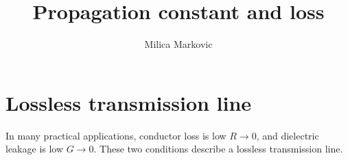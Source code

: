 \documentclass{ximera}
\title{Propagation constant and loss}
\author{Milica Markovic}
\begin{document}
  
\begin{abstract}  

\end{abstract}  
\maketitle    





\section{Lossless transmission line}


In many practical applications, conductor loss is low $R\to 0$, and dielectric leakage is low $G \to 0$. These two conditions describe a
lossless transmission line.
\end{document}
